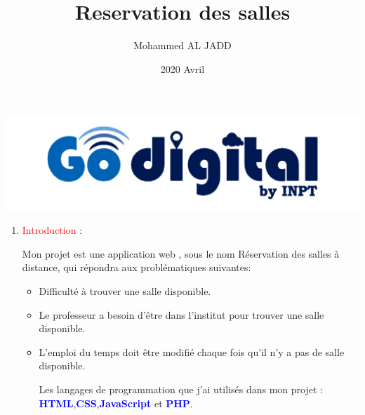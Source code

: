 \documentclass{article}
\title{Reservation des salles}
\author{Mohammed AL JADD}
\date{2020 Avril}
\begin{document}
\maketitle

    

\vspace{2cm}

\includegraphics[width=\textwidth]{img/Go.png}

\begin{enumerate}
    
     \item  \textcolor{red}{\huge Introduction} : 
     \vspace{1cm}
 
   \setlength{\parindent}{1cm} Mon projet est une application web , sous le nom Réservation des salles à distance, qui répondra aux problématiques suivantes:
   \vspace{0.3cm}
   \begin{itemize}
     
        \item Difficulté à trouver une salle disponible.
        \item Le professeur a besoin d'être dans l'institut pour trouver une salle disponible.
        \item L'emploi du temps doit être modifié chaque fois qu'il n'y a pas de salle disponible.
        
            Les langages de programmation que j'ai utilisés dans mon projet : \textcolor{blue}{ \textbf{HTML}},\textcolor{blue}{\textbf{CSS}},\textcolor{blue}{\textbf{JavaScript}} et \textcolor{blue}{\textbf{PHP}}.
   \end{itemize}
   \vspace{0.3cm}
   

\end{enumerate}
\end{document}
